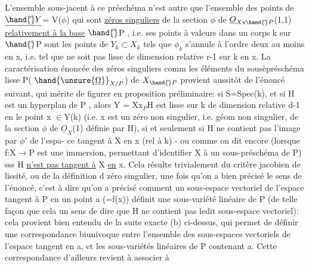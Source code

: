 
\margin{$|$}L'ensemble sous-jacent à ce préschéma n'est autre que l'ensemble des
points de $\underline{\hand{\check{}}Y}$= V($\phi$) qui sont \uline{zéros singuliers} de la section $\phi$ de
$\underline{O}_{X\mathrm{x}\hand{\check{}}P}$(1,1) \uline{relativement à la base} $\hand{\check{}}$P , i.e. ses points  à valeurs dans
un corps k sur $\hand{\check{}}$P sont les points  de $Y_k\subset X_k$ tels que 
 $\phi_k$ s'annule à l'ordre deux au moins
en x, i.e. tel que  ne soit pas lisse de dimension relative r-1
sur k en x. La caractérisation énoncée des  zéros singuliers comm
les éléments du sousèpréschéma lisse P( $\hand{\unsure{\underline{\Omega}}}_{X/P}$) de $X_{\hand{\check{}}P}$ provient aussitôt
de l'énoncé suivant, qui mérite de figurer en proposition préliminaire:
si S=Spec(k), et si H est un hyperplan de P , alors Y = X$\mathrm{x}_P$H est
 lisse sur k de
dimension relative d-1 en le point x $\in$Y(k) (i.e. x est un zéro non
singulier, i.e. géom non singulier, de la section $\phi$ de $\underline{O}_X$(1) définie
par H), si et seulement si H ne contient pas l'image par $\phi'$ de l'espa-%
ce tangent à X en x (rel à k) - ou  comme on dit encore
(lorsque f:X$\longrightarrow$P est une immersion, permettant d'identifier X à un
sous-préschéma de P) sss H \uline{n'est pas tangent à} X \uline{en} x. Cela résulte
trivialement du critère jacobien de lissité, ou de la définition d
zéro singulier, une fois qu'on a bien précisé le sens de l'énoncé,
c'est à dire qu'on a précisé comment un  sous-espace
\margin{$|$}vectoriel de l'espace tangent à P en un point a (=f(x)) définit une
sous-variété linéaire de P (de telle façon que cela  un sens de dire
que H ne contient pas ledit sous-espace vectoriel): cela provient
bien entendu de la suite exacte (b) ci-dessus, qui permet de
définir une correspondance biunivoque entre l'ensemble des sous-espaces
vectoriels de l'espace tangent en a, et les sous-variétés linéaires de
P contenant a. Cette correspondance d'ailleurs revient à associer à

